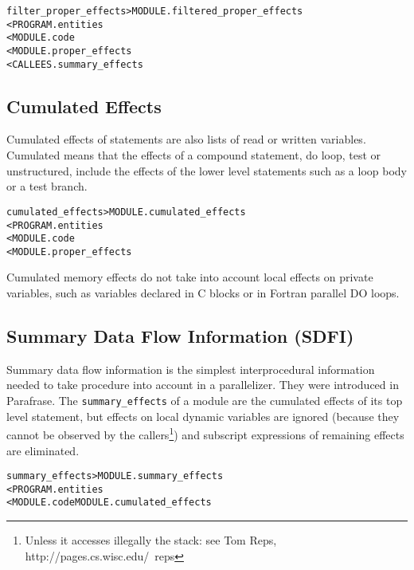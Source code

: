 \documentclass[a4paper]{report}
\newenvironment{PipsMake}{\begin{alltt}}{\end{alltt}}
\begin{document}
\begin{PipsMake}
filter_proper_effects         > MODULE.filtered_proper_effects
        < PROGRAM.entities
        < MODULE.code
        < MODULE.proper_effects
        < CALLEES.summary_effects
\end{PipsMake}


\subsection{Cumulated Effects}
\label{subsubsection-cumulated-effects}

Cumulated effects of statements are also lists of read or written
variables. Cumulated means that the effects of a compound statement, do
loop, test or unstructured, include the effects of the lower level
statements such as a loop body or a test branch.

\begin{PipsMake}
cumulated_effects               > MODULE.cumulated_effects
        < PROGRAM.entities
        < MODULE.code
        < MODULE.proper_effects
\end{PipsMake}

Cumulated memory effects do not take into account local effects on
private variables, such as variables declared in C blocks or in
Fortran parallel DO loops. 



\subsection{Summary Data Flow Information (SDFI)}
\label{subsubection-summary-data-flow-information}

Summary data flow information is the simplest interprocedural
information needed to take procedure into account in a
parallelizer. They were introduced in Parafrase. The
\verb+summary_effects+ of a module are the cumulated effects of its
top level statement, but effects on local dynamic variables are
ignored (because they cannot be observed by the callers\footnote{Unless
it accesses illegally the stack: see Tom Reps,
http://pages.cs.wisc.edu/~reps}) and subscript expressions of remaining
effects are eliminated.


\begin{PipsMake}
summary_effects                 > MODULE.summary_effects
        < PROGRAM.entities
        < MODULE.code MODULE.cumulated_effects
\end{PipsMake}
\end{document}
